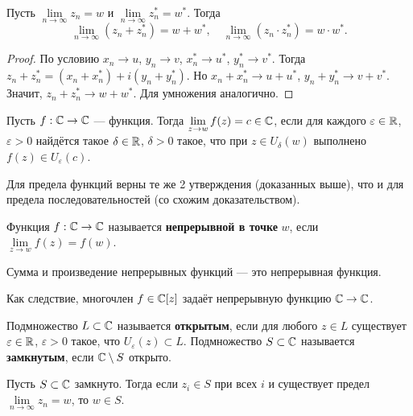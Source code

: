 \begin{theorem}
    Пусть $\lim\limits_{n \rightarrow \infty}z_n = w$ и $\lim\limits_{n \rightarrow \infty}z_n^\ast = w^\ast$. Тогда
    $$
    \lim_{n \rightarrow \infty}(z_n + z_n^\ast) = w + w^\ast,\quad\lim_{n \rightarrow \infty}(z_n \cdot z_n^\ast) = w \cdot w^\ast.
    $$
\end{theorem}

\begin{proof}
    По условию $x_n \rightarrow u$, $y_n \rightarrow v$, $x_n^\ast \rightarrow u^\ast$, $y_n^\ast \rightarrow v^\ast$. Тогда $z_n + z_n^\ast = (x_n + x_n^\ast) + i(y_n + y_n^\ast)$. Но $x_n + x_n^\ast \rightarrow u + u^\ast$, $y_n + y_n^\ast \rightarrow v + v^\ast$. Значит, $z_n + z_n^\ast \rightarrow w + w^\ast$. Для умножения аналогично.
\end{proof}

\begin{definition}
    Пусть $f: \mathbb{C} \rightarrow \mathbb{C}$ --- функция. Тогда $\lim\limits_{z \rightarrow w}f(z) = c \in \mathbb{C}$, если для каждого $\varepsilon \in \mathbb{R}$, $\varepsilon > 0$ найдётся такое $\delta \in \mathbb{R}$, $\delta > 0$ такое, что при $z \in U_\delta(w)$ выполнено $f(z) \in U_\varepsilon(c)$.
\end{definition}

Для предела функций верны те же 2 утверждения (доказанных выше), что и для предела последовательностей (со схожим доказательством).

\begin{definition}
    Функция $f: \mathbb{C} \rightarrow \mathbb{C}$ называется \textbf{непрерывной в точке} $w$, если $\lim\limits_{z \rightarrow w}f(z) = f(w)$.
\end{definition}

\begin{lemma}
    Сумма и произведение непрерывных функций --- это непрерывная функция.
\end{lemma}

Как следствие, многочлен $f \in \mathbb{C}[z]$ задаёт непрерывную функцию $\mathbb{C} \rightarrow \mathbb{C}$.

\begin{definition}
    Подмножество $L \subset \mathbb{C}$ называется \textbf{открытым}, если для любого $z \in L$ существует $\varepsilon \in \mathbb{R}$, $\varepsilon > 0$ такое, что $U_\varepsilon(z) \subset L$. Подмножество $S \subset \mathbb{C}$ называется \textbf{замкнутым}, если $\mathbb{C} \setminus S$ открыто.
\end{definition}

\begin{lemma}
    Пусть $S \subset \mathbb{C}$ замкнуто. Тогда если $z_i \in S$ при всех $i$ и существует предел $\lim\limits_{n \rightarrow \infty}z_n = w$, то $w \in S$.
\end{lemma}

